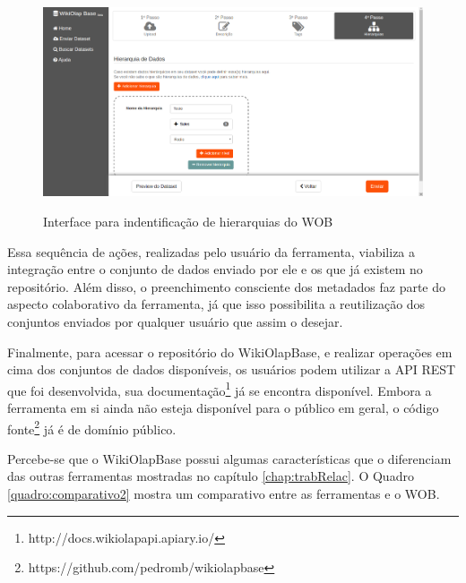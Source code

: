 \begin{figure}[!htb]
    \centering
    \caption{Interface para indentificação de hierarquias do WOB}
    \includegraphics[width=1\textwidth]{./04-figuras/wob-hierarquia}
    \label{fig:wob-hierarquia}
\end{figure}

Essa sequência de ações, realizadas pelo usuário da ferramenta, viabiliza a integração entre
o conjunto de dados enviado por ele e os que já existem no repositório. Além disso, o 
preenchimento consciente dos metadados faz parte do aspecto colaborativo da ferramenta, 
já que isso possibilita a reutilização dos conjuntos enviados por qualquer usuário que 
assim o desejar.

Finalmente, para acessar o repositório do WikiOlapBase, e realizar operações em cima dos 
conjuntos de dados disponíveis, os usuários podem utilizar a API REST que foi desenvolvida, 
sua documentação\footnote{http://docs.wikiolapapi.apiary.io/} já se encontra disponível. 
Embora a ferramenta em si ainda não esteja disponível para o público em geral, o código 
fonte\footnote{https://github.com/pedromb/wikiolapbase} já é de domínio público.

Percebe-se que o WikiOlapBase possui algumas características que o diferenciam das outras ferramentas
mostradas no capítulo \ref{chap:trabRelac}. O Quadro \ref{quadro:comparativo2} mostra um 
comparativo entre as ferramentas e o WOB. \newpage

